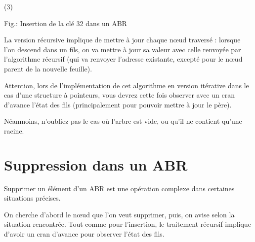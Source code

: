 \documentclass[11pt,a4paper]{article}
\begin{document}
\begin{table}[ht!]
\begin{minipage}{0.30\textwidth}
(3)

  \end{minipage}
\caption{Fig.\thefigure : Insertion de la clé 32 dans un ABR}
\label{fig:example3-BST-insertion-leaf-1}
\end{table}



La version récursive implique de mettre à jour chaque nœud traversé : lorsque l'on descend dans un fils, on va mettre à jour sa valeur avec celle renvoyée par l'algorithme récursif (qui va renvoyer l'adresse existante, excepté pour le nœud parent de la nouvelle feuille).

Attention, lors de l'implémentation de cet algorithme en version itérative dans le cas d'une structure à pointeurs, vous devrez cette fois observer avec un cran d'avance l'état des fils (principalement pour pouvoir mettre à jour le père).

Néanmoins, n'oubliez pas le cas où l'arbre est vide, ou qu'il ne contient qu'une racine.






\bigskip


\section{Suppression dans un ABR}

Supprimer un élément d'un ABR est une opération complexe dans certaines situations précises.

On cherche d'abord le nœud que l'on veut supprimer, puis, on avise selon la situation rencontrée.
Tout comme pour l'insertion, le traitement récursif implique d'avoir un cran d'avance pour observer l'état des fils.

\medskip
\end{document}
